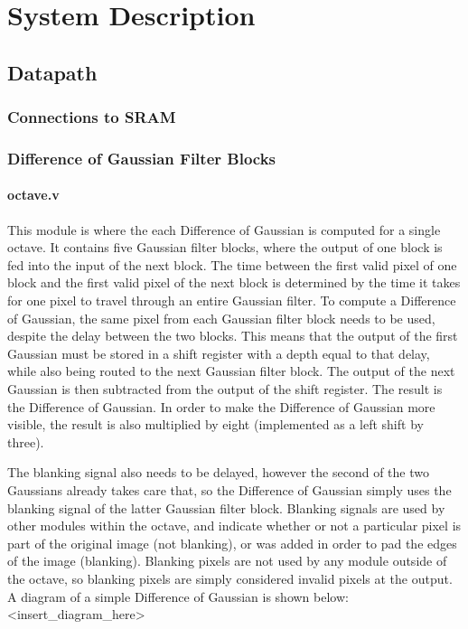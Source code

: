 \documentclass[12pt]{article}
\begin{document}
\section{System Description}

\subsection{Datapath}

\subsubsection{Connections to SRAM}


\subsubsection{Difference of Gaussian Filter Blocks}

\paragraph{octave.v}

This module is where the each Difference of Gaussian is computed for a single octave. It contains five Gaussian filter blocks, where the output of one block is fed into the input of the next block. The time between the first valid pixel of one block and the first valid pixel of the next block is determined by the time it takes for one pixel to travel through an entire Gaussian filter. To compute a Difference of Gaussian, the same pixel from each Gaussian filter block needs to be used, despite the delay between the two blocks. This means that the output of the first Gaussian must be stored in a shift register with a depth equal to that delay, while also being routed to the next Gaussian filter block. The output of the next Gaussian is then subtracted from the output of the shift register. The result is the Difference of Gaussian. In order to make the Difference of Gaussian more visible, the result is also multiplied by eight (implemented as a left shift by three).

The blanking signal also needs to be delayed, however the second of the two 
Gaussians already takes care that, so the Difference of Gaussian simply uses the 
blanking signal of the latter Gaussian filter block. Blanking signals are used 
by other modules within the octave, and indicate whether or not a particular 
pixel is part of the original image (not blanking), or was added in order to pad 
the edges of the image (blanking). Blanking pixels are not used by any module 
outside of the octave, so blanking pixels are simply considered invalid pixels 
at the output. A diagram of a simple Difference of Gaussian is shown below: 
<insert\_diagram\_here>
\end{document}
